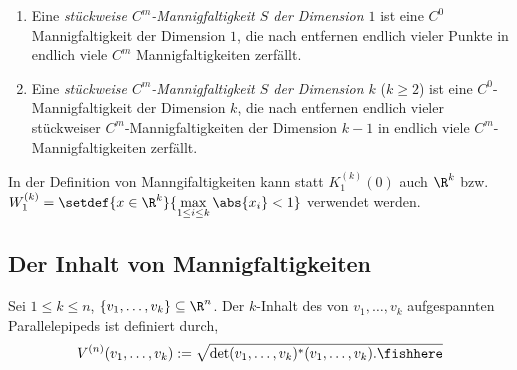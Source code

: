 \begin{defn}
\label{defn:4.14}
\begin{enumerate}[label=\arabic{*}.)]
  \item Eine \emph{stückweise $C^m$-Mannigfaltigkeit $S$ der Dimension $1$} ist
  eine $C^0$ Mannigfaltigkeit der Dimension $1$, die nach entfernen endlich
  vieler Punkte in endlich viele $C^m$ Mannigfaltigkeiten zerfällt.
  \item Eine \emph{stückweise $C^m$-Mannigfaltigkeit $S$ der Dimension $k$}
  ($k \ge 2$) ist eine $C^0$-Mannigfaltigkeit der Dimension $k$, die nach
  entfernen endlich vieler stückweiser $C^m$-Mannigfaltigkeiten der Dimension
  $k-1$ in endlich viele $C^m$-Mannigfaltigkeiten zerfällt.\fishhere
\end{enumerate}
\end{defn}

\begin{bem}
\label{bem:4.15}
In der Definition von Manngifaltigkeiten kann statt $K_1^{(k)}(0)$ auch $\R^k$
bzw. $W_1^{(k)} = \setdef{x\in\R^k}{\max\limits_{1\le i\le k} \abs{x_i} <1}$
verwendet werden.\maphere
\end{bem}

\subsection{Der Inhalt von Mannigfaltigkeiten}
\begin{defn}
\label{defn:4.16}
Sei $1\le k\le n$, $\{v_1,\ldots,v_k\}\subseteq\R^n$. Der $k$-Inhalt des von
$v_1,\ldots,v_k$ aufgespannten Parallelepipeds ist definiert durch,
\begin{align*}
V^{(n)}(v_1,\ldots,v_k) := \sqrt{
\det (v_1,\ldots,v_k)^*(v_1,\ldots,v_k).\fishhere
} 
\end{align*}
\end{defn}

